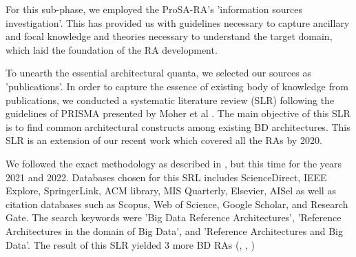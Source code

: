 \documentclass[runningheads]{llncs}
\begin{document}
For this sub-phase, we employed the ProSA-RA's 'information sources investigation'. This has provided us with guidelines necessary to capture ancillary and focal knowledge and theories necessary to understand the target domain, which laid the foundation of the RA development. 

To unearth the essential architectural quanta, we selected our sources as 'publications'. In order to capture the essence of existing body of knowledge from publications, we conducted a systematic literature review (SLR) following the guidelines of PRISMA presented by Moher et al \cite{Shamseer}. The main objective of this SLR is to find common architectural constructs among existing BD architectures. This SLR is an extension of our recent work \cite{AtaeiACIS} which covered all the RAs by 2020. 

We followed the exact methodology as described in \cite{AtaeiACIS}, but this time for the years 2021 and 2022. Databases chosen for this SRL includes ScienceDirect, IEEE Explore, SpringerLink, ACM
library, MIS Quarterly, Elsevier, AISel as well as citation databases such as Scopus, Web of Science, Google Scholar, and Research Gate. The search keywords were  ’Big Data Reference Architectures’, ’Reference Architectures in the domain of Big Data’, and ’Reference Architectures and Big Data’. The result of this SLR yielded 3 more BD RAs (\cite{castellanos2021smart}, \cite{sang2017simplifying}, \cite{AtaeiApsec})

%
%



\end{document}
